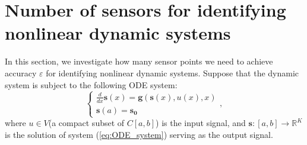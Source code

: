 \documentclass[11pt]{article}
\begin{document}


\section{Number of sensors for identifying nonlinear dynamic systems}
\label{sec:theory}

In this section, we investigate how many sensor points we need to achieve accuracy $\varepsilon$ for identifying nonlinear dynamic systems. Suppose that the dynamic system is subject to the following ODE system:
\begin{equation} \label{eq:ODE_system}
\left\{\begin{array}{l}\frac{d}{dx}\boldsymbol{s}(x)=\boldsymbol{g}(\boldsymbol{s}(x),u(x),x) \\
\boldsymbol{s}(a)=\boldsymbol{s_0}\end{array}\right. ,
\end{equation}
where $u\in V$(a compact subset of $C[a,b]$) is the input signal, and $\boldsymbol{s}:[a,b]\rightarrow\mathbb{R}^{K}$ is the solution of system (\ref{eq:ODE_system}) serving as the output signal.
\end{document}
